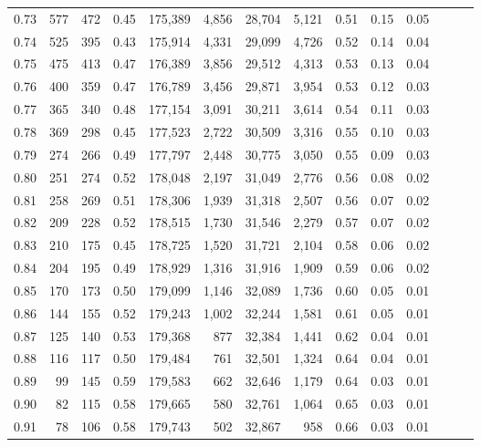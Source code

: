 \begin{tabular}{rrrrrrrrrrrrrr}
0.73 &    577 &  472 &  0.45 &  175,389 &    4,856 &  28,704 &   5,121 &  0.51 &  0.15 &      0.05 \\
0.74 &    525 &  395 &  0.43 &  175,914 &    4,331 &  29,099 &   4,726 &  0.52 &  0.14 &      0.04 \\
0.75 &    475 &  413 &  0.47 &  176,389 &    3,856 &  29,512 &   4,313 &  0.53 &  0.13 &      0.04 \\
0.76 &    400 &  359 &  0.47 &  176,789 &    3,456 &  29,871 &   3,954 &  0.53 &  0.12 &      0.03 \\
0.77 &    365 &  340 &  0.48 &  177,154 &    3,091 &  30,211 &   3,614 &  0.54 &  0.11 &      0.03 \\
0.78 &    369 &  298 &  0.45 &  177,523 &    2,722 &  30,509 &   3,316 &  0.55 &  0.10 &      0.03 \\
0.79 &    274 &  266 &  0.49 &  177,797 &    2,448 &  30,775 &   3,050 &  0.55 &  0.09 &      0.03 \\
0.80 &    251 &  274 &  0.52 &  178,048 &    2,197 &  31,049 &   2,776 &  0.56 &  0.08 &      0.02 \\
0.81 &    258 &  269 &  0.51 &  178,306 &    1,939 &  31,318 &   2,507 &  0.56 &  0.07 &      0.02 \\
0.82 &    209 &  228 &  0.52 &  178,515 &    1,730 &  31,546 &   2,279 &  0.57 &  0.07 &      0.02 \\
0.83 &    210 &  175 &  0.45 &  178,725 &    1,520 &  31,721 &   2,104 &  0.58 &  0.06 &      0.02 \\
0.84 &    204 &  195 &  0.49 &  178,929 &    1,316 &  31,916 &   1,909 &  0.59 &  0.06 &      0.02 \\
0.85 &    170 &  173 &  0.50 &  179,099 &    1,146 &  32,089 &   1,736 &  0.60 &  0.05 &      0.01 \\
0.86 &    144 &  155 &  0.52 &  179,243 &    1,002 &  32,244 &   1,581 &  0.61 &  0.05 &      0.01 \\
0.87 &    125 &  140 &  0.53 &  179,368 &      877 &  32,384 &   1,441 &  0.62 &  0.04 &      0.01 \\
0.88 &    116 &  117 &  0.50 &  179,484 &      761 &  32,501 &   1,324 &  0.64 &  0.04 &      0.01 \\
0.89 &     99 &  145 &  0.59 &  179,583 &      662 &  32,646 &   1,179 &  0.64 &  0.03 &      0.01 \\
0.90 &     82 &  115 &  0.58 &  179,665 &      580 &  32,761 &   1,064 &  0.65 &  0.03 &      0.01 \\
0.91 &     78 &  106 &  0.58 &  179,743 &      502 &  32,867 &     958 &  0.66 &  0.03 &      0.01 \\

\end{tabular}
